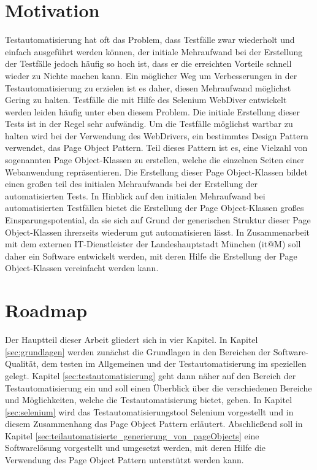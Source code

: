 \section{Motivation}
\label{sec:motivation}
Testautomatisierung hat oft das Problem, dass Testfälle zwar wiederholt und einfach ausgeführt werden können, der initiale Mehraufwand bei der Erstellung der Testfälle jedoch häufig so hoch ist, dass er die erreichten Vorteile schnell wieder zu Nichte machen kann. Ein möglicher Weg um Verbesserungen in der Testautomatisierung zu erzielen ist es daher, diesen Mehraufwand möglichst Gering zu halten.
Testfälle die mit Hilfe des Selenium WebDiver entwickelt werden leiden häufig unter eben diesem Problem. Die initiale Erstellung dieser Tests ist in der Regel sehr aufwändig.
Um die Testfälle möglichst wartbar zu halten wird bei der Verwendung des WebDrivers, ein bestimmtes Design Pattern verwendet, das Page Object Pattern.
Teil dieses Pattern ist es, eine Vielzahl von sogenannten Page Object-Klassen zu erstellen, welche die einzelnen Seiten einer Webanwendung repräsentieren. Die Erstellung dieser Page Object-Klassen bildet einen großen teil des initialen Mehraufwands bei der Erstellung der automatisierten Tests.
In Hinblick auf den initialen Mehraufwand bei automatisierten Testfällen bietet die Erstellung der Page Object-Klassen großes Einsparungspotential, da sie sich auf Grund der generischen Struktur dieser Page Object-Klassen ihrerseits wiederum gut automatisieren lässt.
In Zusammenarbeit mit dem externen IT-Dienstleister der Landeshauptstadt München (it@M) soll daher ein Software entwickelt werden, mit deren Hilfe die Erstellung der Page Object-Klassen vereinfacht werden kann.

\section{Roadmap}
\label{roadmap}
Der Hauptteil dieser Arbeit gliedert sich in vier Kapitel. In Kapitel \ref{sec:grundlagen} werden zunächst die Grundlagen in den Bereichen der Software-Qualität, dem testen im Allgemeinen und der Testautomatisierung im speziellen gelegt.
Kapitel \ref{sec:testautomatisierung} geht dann näher auf den Bereich der Testautomatisierung ein und soll einen Überblick über die verschiedenen Bereiche und Möglichkeiten, welche die Testautomatisierung bietet, geben.
In Kapitel \ref{sec:selenium} wird das Testautomatisierungstool Selenium vorgestellt und in diesem Zusammenhang das Page Object Pattern erläutert.
Abschließend soll in Kapitel \ref{sec:teilautomatisierte_generierung_von_pageObjects} eine Softwarelösung vorgestellt und umgesetzt werden, mit deren Hilfe die Verwendung des Page Object Pattern unterstützt werden kann.

  




